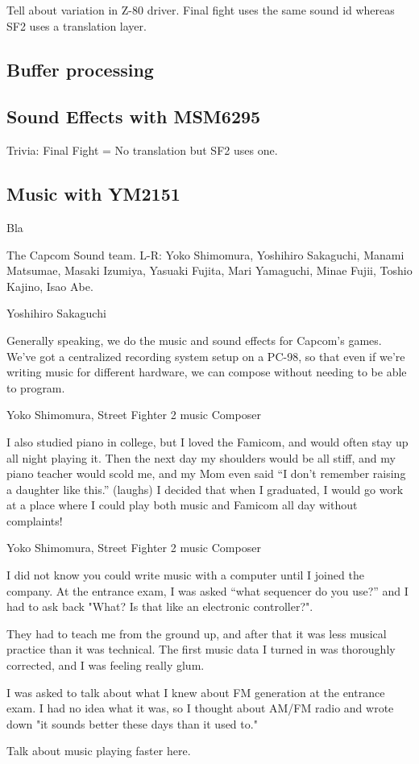 Tell about variation in Z-80 driver. Final fight uses the same sound id whereas SF2 uses a translation layer.

\subsection{Buffer processing}

\subsection{Sound Effects with MSM6295}
Trivia: Final Fight = No translation but SF2 uses one.

\subsection{Music with YM2151}
Bla


The Capcom Sound team. L-R: Yoko Shimomura, Yoshihiro Sakaguchi, Manami Matsumae, Masaki Izumiya, Yasuaki Fujita, Mari Yamaguchi, Minae Fujii, Toshio Kajino, Isao Abe.

\begin{q}{Yoshihiro Sakaguchi\cite{yoko_shimomura_interview}  }

Generally speaking, we do the music and sound effects for Capcom’s games. We’ve got a centralized recording system setup on a PC-98, so that even if we’re writing music for different hardware, we can compose without needing to be able to program.
\end{q}

\begin{q}{Yoko Shimomura, Street Fighter 2 music Composer\cite{beep199010}}

I also studied piano in college, but I loved the Famicom, and would often stay up all night playing it. Then the next day my shoulders would be all stiff, and my piano teacher would scold me, and my Mom even said “I don’t remember raising a daughter like this.” (laughs) I decided that when I graduated, I would go work at a place where I could play both music and Famicom all day without complaints!
\end{q}

\begin{q}{Yoko Shimomura, Street Fighter 2 music Composer\cite{beep199010}}
  
I did not know you could write music with a computer until I joined the company. At the entrance exam, I was asked “what sequencer do you use?” and I had to ask back "What? Is that like an electronic controller?".

They had to teach me from the ground up, and after that it was less musical practice than it was technical. The first music data I turned in was thoroughly corrected, and I was feeling really glum.

I was asked to talk about what I knew about FM generation at the entrance exam. I had no idea what it was, so I thought about AM/FM radio and wrote down "it sounds better these days than it used to."
\end{q}


\begin{trivia}
Talk about music playing faster here.
\end{trivia}